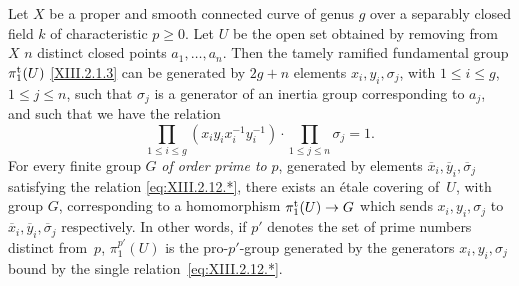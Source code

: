 \begin{corollary}
\label{XIII.2.12}
Let $X$ be a proper and smooth connected curve of genus $g$ over a
separably closed field $k$ of characteristic $p\geq
0$. Let $U$ be the open set obtained by removing from $X$ $n$ distinct
closed points $a_1,\dots,a_n$. Then the tamely ramified
fundamental group $\pi_1^{\mathrm{t}}(U)$ \eqref{XIII.2.1.3}
can be generated by $2g+n$ elements $x_i,
y_i,\sigma_j$, with $1\leq i\leq g$, $1\leq j\leq n$, such that
$\sigma_j$ is a generator of an inertia group
corresponding to $a_j$, and such that we have the relation
\begin{equation*}
\label{eq:XIII.2.12.*}
\tag{$*$} \prod_{1\leq i\leq
g}(x_iy_ix^{-1}_iy^{-1}_i)\cdot\prod_{1\leq j\leq n}\sigma_j=1.
\end{equation*}
For every finite group $G$ \emph{of order prime to} $p$,
generated by elements $\overline{x}_i,
\overline{y}_i,\overline{\sigma}_j$ satisfying the relation
\eqref{eq:XIII.2.12.*}, there exists an \'etale covering of~$U$,
with group $G$, corresponding to a homomorphism
$\pi_1^{\tame}(U)\to G$ which
sends $x_i, y_i,\sigma_j$ to~$\overline{x}_i,
\overline{y}_i,\overline{\sigma}_j$ respectively. In other
words, if $p'$ denotes the set of prime numbers distinct
from~$p$, $\pi_1^{p'}(U)$ is the pro-$p'$-group generated by the
generators $x_i, y_i,\sigma_j$ bound by the single relation~\eqref{eq:XIII.2.12.*}.
\end{corollary}

